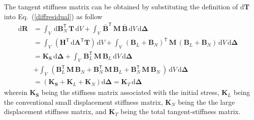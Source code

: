 The tangent stiffness matrix can be obtained by substituting the definition of $\mathrm{d} \mathbf{T}$ into Eq.~(\ref{diffresidual}) as follow 
\begin{equation}
\begin{aligned}
\mathrm{d} \mathbf{R} & = \int_{V} \, \mathrm{d} \mathbf{B}_N^{\mathsf{T}} \, \mathbf{T} \, \mathrm{d} V + \int_{V} \, \bar{\mathbf{B}}^{\mathsf{T}} \, \mathbf{M} \, \bar{\mathbf{B}} \, \mathrm{d} V \, \mathrm{d} \boldsymbol{\Delta} \\ 
& = \int_{V} \,  (\mathbf{H}^{\mathsf{T}} \, \mathrm{d} \mathbf{A}^{\mathsf{T}} \mathbf{T}) \, \mathrm{d} V + \int_{V} \, \left(\mathbf{B}_L + \mathbf{B}_N \right)^{\mathsf{T}} \, \mathbf{M} \,  \left(\mathbf{B}_L + \mathbf{B}_N \right) \, \mathrm{d} V \, \mathrm{d} \boldsymbol{\Delta} \\ 
& = \mathbf{K}_\mathbf{S}  \, \mathrm{d} \boldsymbol{\Delta} + \int_{V} \, \mathbf{B}_L^{\mathsf{T}} \, \mathbf{M} \, \mathbf{B}_L \, \mathrm{d} V \, \mathrm{d} \boldsymbol{\Delta}\\ 
& + \int_{V} \,  \left(\mathbf{B}_L^{\mathsf{T}} \, \mathbf{M} \, \mathbf{B}_N + \mathbf{B}_N^{\mathsf{T}} \, \mathbf{M} \, \mathbf{B}_L + \mathbf{B}_N^{\mathsf{T}} \, \mathbf{M} \, \mathbf{B}_N \, \right) \, \mathrm{d} V \, \mathrm{d} \boldsymbol{\Delta}\\
& = \left(\mathbf{K}_\mathbf{S} + \mathbf{K}_L + \mathbf{K}_N\right)\mathrm{d} \boldsymbol{\Delta} = \mathbf{K}_T \, \mathrm{d} \boldsymbol{\Delta}
\end{aligned} 
\end{equation} 
wherein $\mathbf{K}_\mathbf{S}$ being the stiffness matrix associated with the initial stress, $\mathbf{K}_L$ being the conventional small displacement stiffness matrix, $\mathbf{K}_N$ being the the large displacement stiffness matrix, and $\mathbf{K}_T$ being the total tangent-stiffness matrix. 

